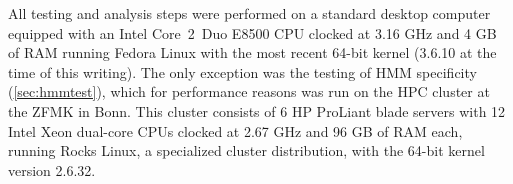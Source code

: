All testing and analysis steps were performed on a standard desktop computer
equipped with an Intel \mbox{Core 2 Duo} E8500 CPU clocked at 3.16 GHz and 4 GB
of RAM running Fedora Linux with the most recent 64-bit kernel (3.6.10 at the
time of this writing). The only exception was the testing of HMM specificity
(\autoref{sec:hmmtest}), which for performance reasons was run on the HPC
cluster at the ZFMK in Bonn. This cluster consists of 6 HP ProLiant blade
servers with 12 Intel Xeon dual-core CPUs clocked at 2.67 GHz and 96 GB of RAM
each, running Rocks Linux, a specialized cluster distribution, with the 64-bit
kernel version 2.6.32.

